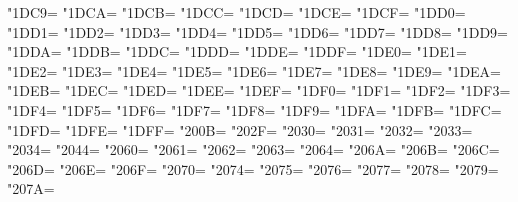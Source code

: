 \XeTeXcharclass"1DC9=\KclassNum
\XeTeXcharclass"1DCA=\KclassNum
\XeTeXcharclass"1DCB=\KclassNum
\XeTeXcharclass"1DCC=\KclassNum
\XeTeXcharclass"1DCD=\KclassNum
\XeTeXcharclass"1DCE=\KclassNum
\XeTeXcharclass"1DCF=\KclassNum
\XeTeXcharclass"1DD0=\KclassNum
\XeTeXcharclass"1DD1=\KclassNum
\XeTeXcharclass"1DD2=\KclassNum
\XeTeXcharclass"1DD3=\KclassNum
\XeTeXcharclass"1DD4=\KclassNum
\XeTeXcharclass"1DD5=\KclassNum
\XeTeXcharclass"1DD6=\KclassNum
\XeTeXcharclass"1DD7=\KclassNum
\XeTeXcharclass"1DD8=\KclassNum
\XeTeXcharclass"1DD9=\KclassNum
\XeTeXcharclass"1DDA=\KclassNum
\XeTeXcharclass"1DDB=\KclassNum
\XeTeXcharclass"1DDC=\KclassNum
\XeTeXcharclass"1DDD=\KclassNum
\XeTeXcharclass"1DDE=\KclassNum
\XeTeXcharclass"1DDF=\KclassNum
\XeTeXcharclass"1DE0=\KclassNum
\XeTeXcharclass"1DE1=\KclassNum
\XeTeXcharclass"1DE2=\KclassNum
\XeTeXcharclass"1DE3=\KclassNum
\XeTeXcharclass"1DE4=\KclassNum
\XeTeXcharclass"1DE5=\KclassNum
\XeTeXcharclass"1DE6=\KclassNum
\XeTeXcharclass"1DE7=\KclassNum
\XeTeXcharclass"1DE8=\KclassNum
\XeTeXcharclass"1DE9=\KclassNum
\XeTeXcharclass"1DEA=\KclassNum
\XeTeXcharclass"1DEB=\KclassNum
\XeTeXcharclass"1DEC=\KclassNum
\XeTeXcharclass"1DED=\KclassNum
\XeTeXcharclass"1DEE=\KclassNum
\XeTeXcharclass"1DEF=\KclassNum
\XeTeXcharclass"1DF0=\KclassNum
\XeTeXcharclass"1DF1=\KclassNum
\XeTeXcharclass"1DF2=\KclassNum
\XeTeXcharclass"1DF3=\KclassNum
\XeTeXcharclass"1DF4=\KclassNum
\XeTeXcharclass"1DF5=\KclassNum
\XeTeXcharclass"1DF6=\KclassNum
\XeTeXcharclass"1DF7=\KclassNum
\XeTeXcharclass"1DF8=\KclassNum
\XeTeXcharclass"1DF9=\KclassNum
\XeTeXcharclass"1DFA=\KclassNum
\XeTeXcharclass"1DFB=\KclassNum
\XeTeXcharclass"1DFC=\KclassNum
\XeTeXcharclass"1DFD=\KclassNum
\XeTeXcharclass"1DFE=\KclassNum
\XeTeXcharclass"1DFF=\KclassNum
\XeTeXcharclass"200B=\KclassNum
\XeTeXcharclass"202F=\KclassNum
\XeTeXcharclass"2030=\KclassNum
\XeTeXcharclass"2031=\KclassNum
\XeTeXcharclass"2032=\KclassNum
\XeTeXcharclass"2033=\KclassNum
\XeTeXcharclass"2034=\KclassNum
\XeTeXcharclass"2044=\KclassNum
\XeTeXcharclass"2060=\KclassNum
\XeTeXcharclass"2061=\KclassNum
\XeTeXcharclass"2062=\KclassNum
\XeTeXcharclass"2063=\KclassNum
\XeTeXcharclass"2064=\KclassNum
\XeTeXcharclass"206A=\KclassNum
\XeTeXcharclass"206B=\KclassNum
\XeTeXcharclass"206C=\KclassNum
\XeTeXcharclass"206D=\KclassNum
\XeTeXcharclass"206E=\KclassNum
\XeTeXcharclass"206F=\KclassNum
\XeTeXcharclass"2070=\KclassNum
\XeTeXcharclass"2074=\KclassNum
\XeTeXcharclass"2075=\KclassNum
\XeTeXcharclass"2076=\KclassNum
\XeTeXcharclass"2077=\KclassNum
\XeTeXcharclass"2078=\KclassNum
\XeTeXcharclass"2079=\KclassNum
\XeTeXcharclass"207A=\KclassNum
